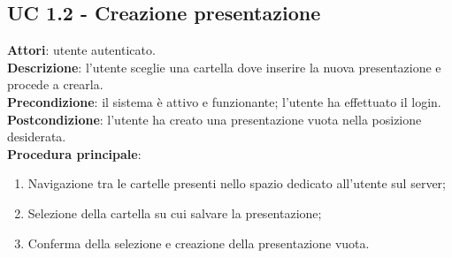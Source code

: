 \subsection{UC 1.2 - Creazione presentazione}{
	\label{uc1.2}
	\textbf{Attori}: utente autenticato.	\\
	\textbf{Descrizione}: l'utente sceglie una cartella dove inserire la nuova presentazione e procede a crearla.	\\
	\textbf{Precondizione}: il sistema è attivo e funzionante; l'utente ha effettuato il login.	\\
	\textbf{Postcondizione}: l'utente ha creato una presentazione vuota nella posizione desiderata.	\\
	\textbf{Procedura principale}:
	\begin{enumerate}
		\item Navigazione tra le cartelle presenti nello spazio dedicato all'utente sul server;
		\item Selezione della cartella su cui salvare la presentazione;
		\item Conferma della selezione e creazione della presentazione vuota.
	\end{enumerate}
	}